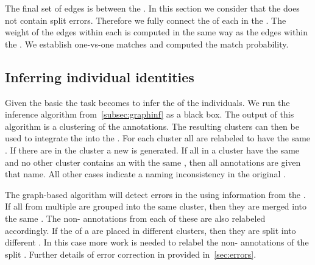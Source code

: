     The final set of edges is between the \lset{}.
    In this section we consider that the \lset{} does not contain split
      errors.
    Therefore we fully connect the \exemplars{} of each \name{} in the
      \masterdatabase{}.
    The weight of the edges within each \name{} is computed in the same way as
      the edges within the \uset{}.
    We establish one-vs-one matches and computed the match probability.

    \subsection{Inferring individual identities}
    Given the basic \idengraph{} the task becomes to infer the \names{} of the
      individuals.
    We run the inference algorithm from~\cref{subsec:graphinf} as a black box.
    The output of this algorithm is a clustering of the annotations.
    The resulting clusters can then be used to integrate the \occurrence{}
      into the \masterdatabase{}.
    For each cluster all \annots{} are relabeled to have the same \name{}.
    If there are \exemplars{} in the cluster a new \name{} is generated.
    If all \exemplars{} in a cluster have the same \name{} and no other
      cluster contains an \exemplar{} with the same \name{}, then all
      \occurrence{} annotations are given that name.
    All other cases indicate a naming inconsistency in the original
      \exemplars{}.

    The graph-based algorithm will detect errors in the \masterdatabase{}
      using information from the \occurrence{}.
    If all \exemplars{} from multiple \names{} are grouped into the same
      cluster, then they are merged into the same \name{}.
    The non-\exemplar{} annotations from each of these \names{} are also
      relabeled accordingly.
    If the \exemplars{} of a \name{} are placed in different clusters, then
      they are split into different \names{}.
    In this case more work is needed to relabel the non-\exemplar{}
      annotations of the split \names{}.
    Further details of error correction in provided in~\cref{sec:errors}.

